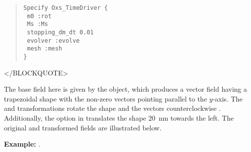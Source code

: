 \begin{description}
\begin{quote}
\begin{verbatim}
Specify Oxs_TimeDriver {
 m0 :rot
 Ms :Ms
 stopping_dm_dt 0.01
 evolver :evolve
 mesh :mesh
}
\end{verbatim}
\end{quote}
\begin{rawhtml}</BLOCKQUOTE>\end{rawhtml}
The base field here is given by the 
object, which produces a vector field having a trapezoidal shape with
the non-zero vectors pointing parallel to the $y$-axis.  The
 and  transformations rotate the shape and the
vectors counterclockwise .
Additionally, the  option in  translates the
shape 20~nm towards the left.  The original and transformed fields are
illustrated below.
%

\textbf{Example:} .


\end{description}

